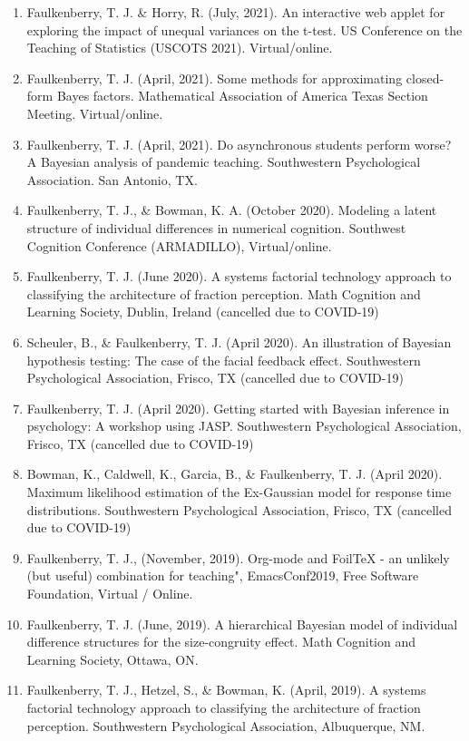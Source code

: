 \documentclass[article,10pt]{article}
\begin{document}
\begin{enumerate}
\item Faulkenberry, T. J. \& Horry, R. (July, 2021). An interactive web applet for exploring the impact of unequal variances on the t-test. US Conference on the Teaching of Statistics (USCOTS 2021). Virtual/online.
\item Faulkenberry, T. J. (April, 2021). Some methods for approximating closed-form Bayes factors. Mathematical Association of America Texas Section Meeting. Virtual/online.
\item Faulkenberry, T. J. (April, 2021). Do asynchronous students perform worse? A Bayesian analysis of pandemic teaching. Southwestern Psychological Association. San Antonio, TX.
\item Faulkenberry, T. J., \& Bowman, K. A. (October 2020). Modeling a latent structure of individual differences in numerical cognition. Southwest Cognition Conference (ARMADILLO), Virtual/online.
\item Faulkenberry, T. J. (June 2020). A systems factorial technology approach to classifying the architecture of fraction perception. Math Cognition and Learning Society, Dublin, Ireland (cancelled due to COVID-19)
\item Scheuler, B., \& Faulkenberry, T. J. (April 2020). An illustration of Bayesian hypothesis testing: The case of the facial feedback effect. Southwestern Psychological Association, Frisco, TX (cancelled due to COVID-19)
\item Faulkenberry, T. J. (April 2020). Getting started with Bayesian inference in psychology: A workshop using JASP. Southwestern Psychological Association, Frisco, TX (cancelled due to COVID-19)
\item Bowman, K., Caldwell, K., Garcia, B., \& Faulkenberry, T. J. (April 2020). Maximum likelihood estimation of the Ex-Gaussian model for response time distributions. Southwestern Psychological Association, Frisco, TX (cancelled due to COVID-19)
\item Faulkenberry, T. J., (November, 2019). Org-mode and FoilTeX - an unlikely (but useful) combination for teaching", EmacsConf2019, Free Software Foundation, Virtual / Online.
\item Faulkenberry, T. J. (June, 2019). A hierarchical Bayesian model of individual difference structures for the size-congruity effect. Math Cognition and Learning Society, Ottawa, ON.
\item Faulkenberry, T. J., Hetzel, S., \& Bowman, K. (April, 2019). A systems factorial technology approach to classifying the architecture of fraction perception. Southwestern Psychological Association, Albuquerque, NM.

\end{enumerate}
\end{document}
